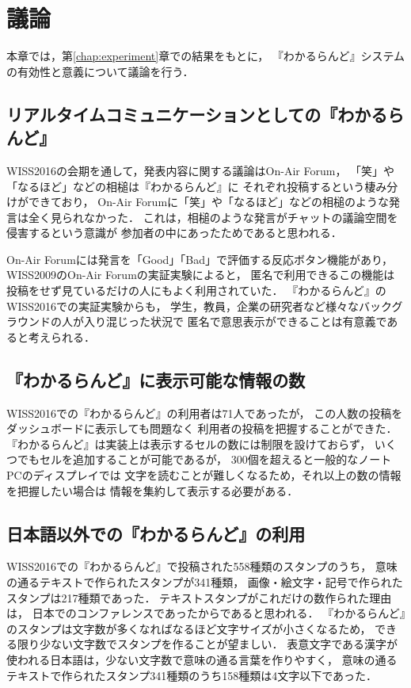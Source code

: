 \chapter{議論}
\label{chap:discussion}

本章では，第\ref{chap:experiment}章での結果をもとに，
『わかるらんど』システムの有効性と意義について議論を行う．

\newpage

\section{リアルタイムコミュニケーションとしての『わかるらんど』}

WISS2016の会期を通して，発表内容に関する議論はOn-Air Forum，
「笑」や「なるほど」などの相槌は『わかるらんど』に
それぞれ投稿するという棲み分けができており，
On-Air Forumに「笑」や「なるほど」などの相槌のような発言は全く見られなかった．
これは，相槌のような発言がチャットの議論空間を侵害するという意識が
参加者の中にあったためであると思われる．

On-Air Forumには発言を「Good」「Bad」で評価する反応ボタン機能があり，
WISS2009のOn-Air Forumの実証実験\cite{nishida2011}によると，
匿名で利用できるこの機能は投稿をせず見ているだけの人にもよく利用されていた．
『わかるらんど』のWISS2016での実証実験からも，
学生，教員，企業の研究者など様々なバックグラウンドの人が入り混じった状況で
匿名で意思表示ができることは有意義であると考えられる．


\section{『わかるらんど』に表示可能な情報の数}

WISS2016での『わかるらんど』の利用者は71人であったが，
この人数の投稿をダッシュボードに表示しても問題なく
利用者の投稿を把握することができた．
『わかるらんど』は実装上は表示するセルの数には制限を設けておらず，
いくつでもセルを追加することが可能であるが，
300個を超えると一般的なノートPCのディスプレイでは
文字を読むことが難しくなるため，それ以上の数の情報を把握したい場合は
情報を集約して表示する必要がある．


\section{日本語以外での『わかるらんど』の利用}

WISS2016での『わかるらんど』で投稿された558種類のスタンプのうち，
意味の通るテキストで作られたスタンプが341種類，
画像・絵文字・記号で作られたスタンプは217種類であった．
テキストスタンプがこれだけの数作られた理由は，
日本でのコンファレンスであったからであると思われる．
『わかるらんど』のスタンプは文字数が多くなればなるほど文字サイズが小さくなるため，
できる限り少ない文字数でスタンプを作ることが望ましい．
表意文字である漢字が使われる日本語は，少ない文字数で意味の通る言葉を作りやすく，
意味の通るテキストで作られたスタンプ341種類のうち158種類は4文字以下であった．

